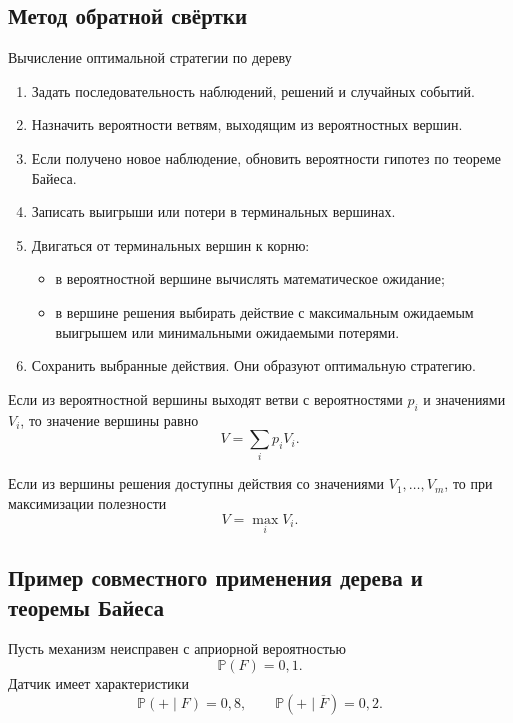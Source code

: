 \documentclass[12pt,a4paper]{article}
\theoremstyle{plain}
\theoremstyle{definition}
\theoremstyle{remark}
\newcommand{\Pp}{\mathbb{P}}
\begin{document}
\subsection{Метод обратной свёртки}

\begin{algorithmblock}{Вычисление оптимальной стратегии по дереву}
\begin{enumerate}[label=\arabic*.]
    \item Задать последовательность наблюдений, решений и случайных
    событий.

    \item Назначить вероятности ветвям, выходящим из вероятностных
    вершин.

    \item Если получено новое наблюдение, обновить вероятности гипотез по
    теореме Байеса.

    \item Записать выигрыши или потери в терминальных вершинах.

    \item Двигаться от терминальных вершин к корню:
    \begin{itemize}
        \item в вероятностной вершине вычислять математическое ожидание;
        \item в вершине решения выбирать действие с максимальным
        ожидаемым выигрышем или минимальными ожидаемыми потерями.
    \end{itemize}

    \item Сохранить выбранные действия. Они образуют оптимальную
    стратегию.
\end{enumerate}
\end{algorithmblock}

Если из вероятностной вершины выходят ветви с вероятностями $p_i$ и
значениями $V_i$, то значение вершины равно
\[
    V=\sum_i p_iV_i.
\]

Если из вершины решения доступны действия со значениями $V_1,\ldots,V_m$,
то при максимизации полезности
\[
    V=\max_i V_i.
\]

\subsection{Пример совместного применения дерева и теоремы Байеса}

Пусть механизм неисправен с априорной вероятностью
\[
    \Pp(F)=0{,}1.
\]
Датчик имеет характеристики
\[
    \Pp(+\mid F)=0{,}8,
    \qquad
    \Pp(+\mid\overline{F})=0{,}2.
\]
\end{document}
